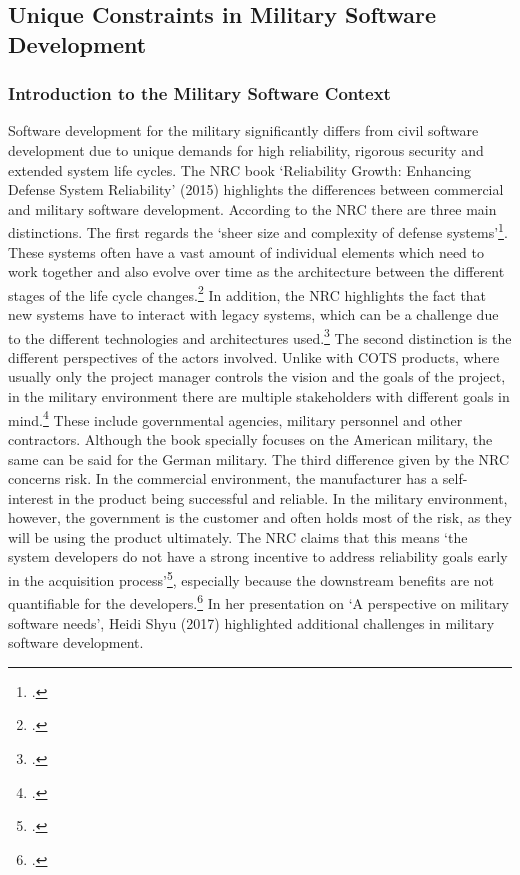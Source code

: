 \subsection{Unique Constraints in Military Software Development}
\subsubsection{Introduction to the Military Software Context}
Software development for the military significantly differs from civil software development due to unique demands for high reliability, rigorous security and extended system life cycles.
The \ac{NRC} book `Reliability Growth: Enhancing Defense System Reliability' (2015) highlights the differences between commercial and military software development.
According to the NRC there are three main distinctions. The first regards the `sheer size and complexity of defense systems'\footcite[31]{nrc2015defense}.
These systems often have a vast amount of individual elements which need to work together and also evolve over time as the architecture  between the different stages of 
the life cycle changes.\footcite[32]{nrc2015defense} In addition, the \ac{NRC} highlights the fact that new systems have to interact with legacy systems, which can be a challenge
due to the different technologies and architectures used.\footcite[32]{nrc2015defense}
The second distinction is the different perspectives of the actors involved. Unlike with \ac{COTS} products, where usually only the project manager 
controls the vision and the goals of the project, in the military environment there are multiple stakeholders with different goals in mind.\footcite[32]{nrc2015defense}
These include governmental agencies, military personnel and other contractors.
Although the book specially focuses on the American military, the same can be said for the German military.
The third difference given by the NRC concerns risk. In the commercial environment, the manufacturer has a self-interest in the product being successful and reliable.
In the military environment, however, the government is the customer and often holds most of the risk, as they will be using the product ultimately.
The NRC claims that this means `the system developers do not have a strong incentive to address reliability goals early in the acquisition process'\footcite[33]{nrc2015defense},
especially because the downstream benefits are not quantifiable for the developers.\footcite[33]{nrc2015defense}
In her presentation on `A perspective on military software needs', Heidi Shyu (2017) highlighted additional challenges in military software development.
